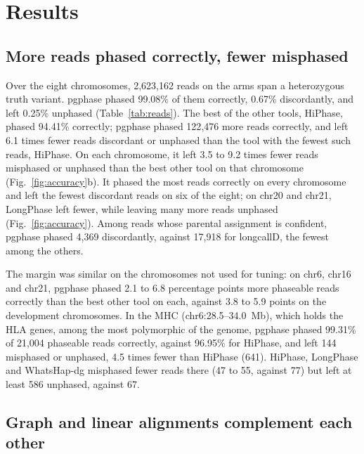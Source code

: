 \section{Results}

\subsection{More reads phased correctly, fewer misphased}

Over the eight chromosomes, 2{,}623,162 reads on the arms span a heterozygous truth variant. pgphase phased 99.08\% of them correctly, 0.67\% discordantly, and left 0.25\% unphased (Table~\ref{tab:reads}). The best of the other tools, HiPhase, phased 94.41\% correctly; pgphase phased 122{,}476 more reads correctly, and left 6.1 times fewer reads discordant or unphased than the tool with the fewest such reads, HiPhase. On each chromosome, it left 3.5 to 9.2 times fewer reads misphased or unphased than the best other tool on that chromosome (Fig.~\ref{fig:accuracy}b). It phased the most reads correctly on every chromosome and left the fewest discordant reads on six of the eight; on chr20 and chr21, LongPhase left fewer, while leaving many more reads unphased (Fig.~\ref{fig:accuracy}). Among reads whose parental assignment is confident, pgphase phased 4{,}369 discordantly, against 17{,}918 for longcallD, the fewest among the others.





The margin was similar on the chromosomes not used for tuning: on chr6, chr16 and chr21, pgphase phased 2.1 to 6.8 percentage points more phaseable reads correctly than the best other tool on each, against 3.8 to 5.9 points on the development chromosomes. In the MHC (chr6:28.5--34.0~Mb), which holds the HLA genes, among the most polymorphic of the genome, pgphase phased 99.31\% of 21{,}004 phaseable reads correctly, against 96.95\% for HiPhase, and left 144 misphased or unphased, 4.5 times fewer than HiPhase (641). HiPhase, LongPhase and WhatsHap-dg misphased fewer reads there (47 to 55, against 77) but left at least 586 unphased, against 67.

\subsection{Graph and linear alignments complement each other}

